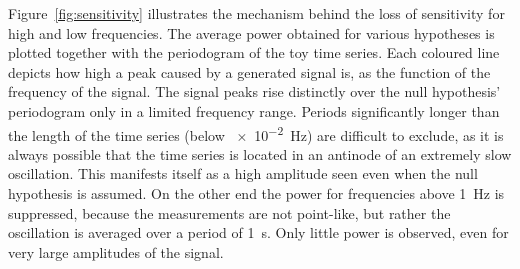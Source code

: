 Figure~\ref{fig:sensitivity} illustrates the mechanism behind the loss of sensitivity for high and low frequencies. The average power obtained for various hypotheses is plotted together with the periodogram of the toy time series. Each coloured line depicts how high a peak caused by a generated signal is, as the function of the frequency of the signal.
The signal peaks rise distinctly over the null hypothesis' periodogram only in a limited frequency range. Periods significantly longer than the length of the time series (below \SI{e-2}{\hertz}) are difficult to exclude, as it is always possible that the time series is located in an antinode of an extremely slow oscillation. This manifests itself as a high amplitude seen even when the null hypothesis is assumed. On the other end the power for frequencies above \SI{1}{\hertz} is suppressed, because the measurements are not point-like, but rather the oscillation is averaged over a period of \SI{1}{\second}. Only little power is observed, even for very large amplitudes of the signal.


